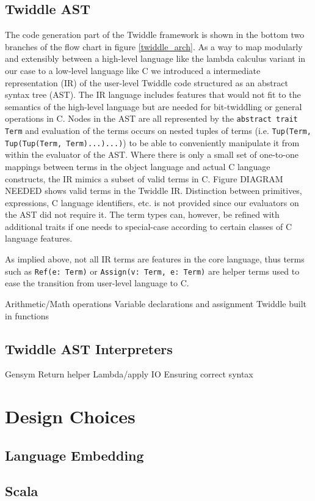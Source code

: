 \documentclass{article}
\begin{document}
\subsection{Twiddle AST}
The code generation part of the Twiddle framework is shown in the bottom two branches of the flow chart in figure \ref{twiddle_arch}. As a way to map modularly and extensibly between a high-level language like the lambda calculus variant in our case to a low-level language like C we introduced a intermediate representation (IR) of the user-level Twiddle code structured as an abstract syntax tree (AST). The IR language includes features that would not fit to the semantics of the high-level language but are needed for bit-twiddling or general operations in C. Nodes in the AST are all represented by the \texttt{abstract trait Term} and evaluation of the terms occurs on nested tuples of terms (i.e. \texttt{Tup(Term, Tup(Tup(Term, Term)...)...)}) to be able to conveniently manipulate it from within the evaluator of the AST. Where there is only a small set of one-to-one mappings between terms in the object language and actual C language constructs, the IR mimics a subset of valid terms in C. Figure DIAGRAM NEEDED shows valid terms in the Twiddle IR. Distinction between primitives, expressions, C language identifiers, etc. is not provided since our evaluators on the AST did not require it. The term types can, however, be refined with additional traits if one needs to special-case according to certain classes of C language features.

As implied above, not all IR terms are features in the core language, thus terms such as \texttt{Ref(e: Term)} or \texttt{Assign(v: Term, e: Term)} are helper terms used to ease the transition from user-level language to C.

Arithmetic/Math operations
Variable declarations and assignment
Twiddle built in functions
\subsection{Twiddle AST Interpreters}
Gensym
Return helper
Lambda/apply
IO
Ensuring correct syntax
\section{Design Choices}
\subsection{Language Embedding}
\subsection{Scala}
\end{document}
